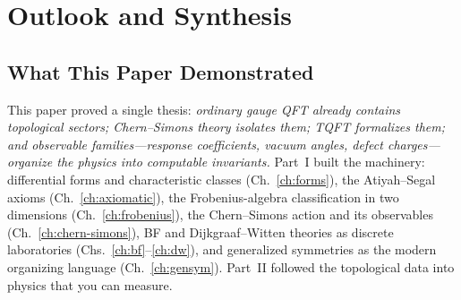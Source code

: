 %
%
%
%
%
%
%

\section{Outlook and Synthesis}
\label{sec:outlook}

\subsection{What This Paper Demonstrated}
\label{subsec:outlook-demonstrated}

This paper proved a single thesis: \emph{ordinary gauge QFT already contains topological sectors; Chern--Simons theory isolates them; TQFT formalizes them; and observable families---response coefficients, vacuum angles, defect charges---organize the physics into computable invariants.} Part~I built the machinery: differential forms and characteristic classes (Ch.~\ref{ch:forms}), the Atiyah--Segal axioms (Ch.~\ref{ch:axiomatic}), the Frobenius-algebra classification in two dimensions (Ch.~\ref{ch:frobenius}), the Chern--Simons action and its observables (Ch.~\ref{ch:chern-simons}), BF and Dijkgraaf--Witten theories as discrete laboratories (Chs.~\ref{ch:bf}--\ref{ch:dw}), and generalized symmetries as the modern organizing language (Ch.~\ref{ch:gensym}). Part~II followed the topological data into physics that you can measure.


